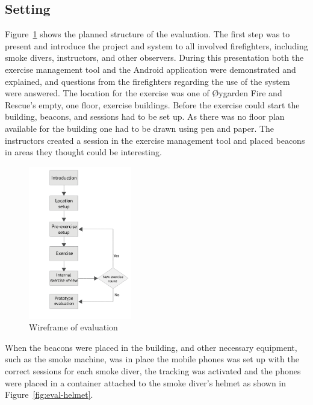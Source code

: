 \documentclass[../Main/thesis.tex]{subfiles}
\begin{document}
\subsection{Setting}
Figure~\ref{fig:eval-wireframe} shows the planned structure of the evaluation.
The first step was to present and introduce the project and system to all involved firefighters, including smoke divers, instructors, and other observers.
During this presentation both the exercise management tool and the Android application were demonstrated and explained, and questions from the firefighters regarding the use of the system were answered.
The location for the exercise was one of Øygarden Fire and Rescue's empty, one floor, exercise buildings.
Before the exercise could start the building, beacons, and sessions had to be set up.
As there was no floor plan available for the building one had to be drawn using pen and paper.
The instructors created a session in the exercise management tool and placed beacons in areas they thought could be interesting.

\begin{figure}[h]
	\centering
	\includegraphics[width=0.4\textwidth]{../fig/eval_wireframe}
	\caption{Wireframe of evaluation}
	\label{fig:eval-wireframe}
\end{figure}

When the beacons were placed in the building, and other necessary equipment, such as the smoke machine, was in place the mobile phones was set up with the correct sessions for each smoke diver, the tracking was activated and the phones were placed in a container attached to the smoke diver's helmet as shown in Figure~\ref{fig:eval-helmet}.
\end{document}

